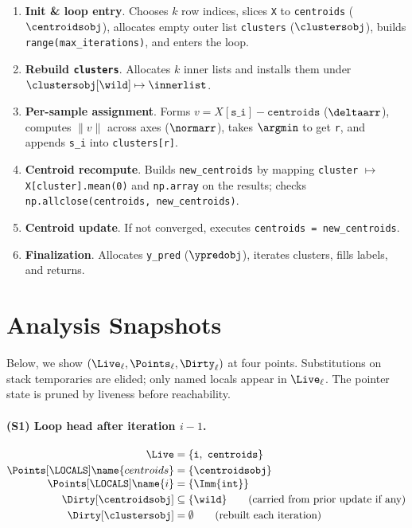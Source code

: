\begin{enumerate}
\item \textbf{Init \& loop entry}. Chooses $k$ row indices, slices \texttt{X} to \texttt{centroids} ($\centroidsobj$), allocates empty outer list \texttt{clusters} ($\clustersobj$), builds \texttt{range(max\_iterations)}, and enters the loop.
\item \textbf{Rebuild \texttt{clusters}}. Allocates $k$ inner lists and installs them under $\clustersobj[\wild]\mapsto \innerlist$.
\item \textbf{Per-sample assignment}. Forms $v = X[\texttt{s\_i}] - \texttt{centroids}$ ($\deltaarr$), computes $\|v\|$ across axes ($\normarr$), takes $\argmin$ to get \texttt{r}, and appends \texttt{s\_i} into \texttt{clusters[r]}.
\item \textbf{Centroid recompute}. Builds \texttt{new\_centroids} by mapping \texttt{cluster} $\mapsto$ \texttt{X[cluster].mean(0)} and \texttt{np.array} on the results; checks \texttt{np.allclose(centroids, new\_centroids)}.
\item \textbf{Centroid update}. If not converged, executes \texttt{centroids = new\_centroids}.
\item \textbf{Finalization}. Allocates \texttt{y\_pred} ($\ypredobj$), iterates clusters, fills labels, and returns.
\end{enumerate}

\section*{Analysis Snapshots}
Below, we show $(\Live_\ell, \Points_\ell, \Dirty_\ell)$ at four points. Substitutions on stack temporaries are elided; only named locals appear in $\Live_\ell$. The pointer state is pruned by liveness before reachability.

\paragraph{(S1) Loop head after iteration $i{-}1$.}
\begin{align*}
\Live &= \{\texttt{i},\ \texttt{centroids}\}\\
\Points[\LOCALS]\name{centroids} &= \{\centroidsobj\}\\[-0.25em]
\Points[\LOCALS]\name{i} &= \{\Imm{\texttt{int}}\}\\
\Dirty[\centroidsobj] &\subseteq \{\wild\}\qquad\text{(carried from prior update if any)}\\
\Dirty[\clustersobj] &= \emptyset\qquad\text{(rebuilt each iteration)}
\end{align*}

